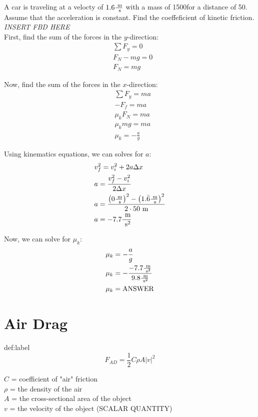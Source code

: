 \begin{problem}
	A car is traveling at a velocty of $1.6 \frac{\text{ m}}{\text{ s}}$ with a mass of 1500\kg \text{ }for a distance of 50\m. Assume that the acceleration is constant. Find the coeffeficient of kinetic friction. \\

	\textit{INSERT FBD HERE}\\

	First, find the sum of the forces in the $y$-direction:
	$$
	\begin{aligned}
		&\sum F_y = 0\\
		&F_N - mg = 0\\
		&F_N = mg
	\end{aligned}
	$$

	Now, find the sum of the forces in the $x$-direction:
	$$
	\begin{aligned}
		&\sum F_y = ma\\
		&-F_f = ma\\
		&\mu_k F_N = ma\\
		&\mu_k mg = ma\\
		&\mu_k = -\frac{a}{g}
	\end{aligned}
	$$

	Using kinematics equations, we can solves for $a$:
	$$
	\begin{aligned}
		&v_f^2 = v_i^2 + 2a\Delta x\\
		&a = \frac{v_f^2-v_i^2}{2 \Delta x}\\
		&a = \frac{\left(0\frac{\text{ m}}{\text{ s}}\right)^2 - \left(1.\bar{6} \frac{\text{ m}}{\text{ s}}\right)^2}{2 \cdot 50 \text{ m}}\\
		&a = -7.7 \frac{\text{ m}}{\text{ s}^2}
	\end{aligned}
	$$

	Now, we can solve for $\mu_k$:
	$$
	\begin{aligned}
		&\mu_k = -\frac{a}{g}\\
		&\mu_k = -\frac{-7.7 \frac{\text{ m}}{\text{ s}^2}}{9.8 \frac{\text{ m}}{\text{ s}^2}}\\
		&\mu_k = \text{ANSWER}
	\end{aligned}
	$$
\end{problem}


\section{Air Drag}

\begin{definition}{def:label}
	$$
		F_{AD} = \frac{1}{2}C\rho A|v|^2
	$$

	$C$ = coefficient of "air" friction\\
	$\rho$ = the density of the air\\
	$A$ = the cross-sectional area of the object\\
	$v$ = the velocity of the object (SCALAR QUANTITY)
\end{definition}



